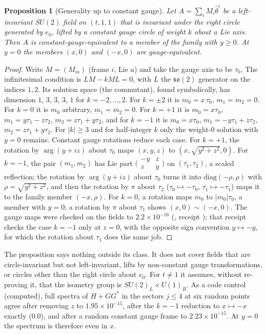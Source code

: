 \documentclass[11pt]{article}
\newtheorem{proposition}[theorem]{Proposition}
\theoremstyle{definition}
\theoremstyle{remark}
\begin{document}
\begin{proposition}[Generality up to constant gauge]\label{prop:general}
Let $A=\sum_iM_i\hat\theta^i$ be a left-invariant $SU(2)$ field on $(t,1,1)$ that is invariant under the right circle
generated by $e_0$, lifted by a constant gauge circle of weight $k$ about a Lie axis. Then $A$ is constant-gauge-equivalent
to a member of the family with $y\ge0$. At $y=0$ the members $(x,0)$ and $(-x,0)$ are gauge-equivalent.
\end{proposition}
\begin{proof}
Write $M=(M_{ia})$ (frame $i$, Lie $a$) and take the gauge axis to be $\tau_0$. The infinitesimal condition is
$LM-kML=0$, with $L$ the $\mathfrak{so}(2)$ generator on the indices $1,2$. Its solution space (the commutant), found
symbolically, has dimension $1$, $3$, $3$, $3$, $1$ for $k=-2,\dots,2$. For $k=\pm2$ it is $m_0=x\,\tau_0$,
$m_1=m_2=0$. For $k=0$ it is $m_0$ arbitrary, $m_1=m_2=0$. For $k=+1$ it is $m_0=x\tau_0$, $m_1=y\tau_1-z\tau_2$,
$m_2=z\tau_1+y\tau_2$, and for $k=-1$ it is $m_0=x\tau_0$, $m_1=-y\tau_1+z\tau_2$, $m_2=z\tau_1+y\tau_2$. For
$|k|\ge3$ and for half-integer $k$ only the weight-$0$ solution with $y=0$ remains. Constant gauge rotations reduce each
case. For $k=+1$, the rotation by $\arg(y+iz)$ about $\tau_0$ maps $(x,y,z)$ to $(x,\sqrt{y^2+z^2},0)$. For $k=-1$,
the pair $(m_1,m_2)$ has Lie part $\bigl(\begin{smallmatrix}-y&z\\ z&y\end{smallmatrix}\bigr)$ on $(\tau_1,\tau_2)$, a
scaled reflection; the rotation by $\arg(y+iz)$ about $\tau_0$ turns it into $\mathrm{diag}(-\rho,\rho)$ with
$\rho=\sqrt{y^2+z^2}$, and then the rotation by $\pi$ about $\tau_2$ ($\tau_0\mapsto-\tau_0$, $\tau_1\mapsto-\tau_1$)
maps it to the family member $(-x,\rho)$. For $k=0$, a rotation maps $m_0$ to $|m_0|\tau_0$, a member with $y=0$; a
rotation by $\pi$ about $\tau_1$ shows $(x,0)\sim(-x,0)$. The gauge maps were checked on the fields to
$2.2\times10^{-16}$ (, receipt
); that receipt checks the case $k=-1$ only at $z=0$, with
the opposite sign convention $y\mapsto-y$, for which the rotation about $\tau_1$ does the same job.
\end{proof}

The proposition says nothing outside its class. It does not cover fields that are circle-invariant but not
left-invariant, lifts by non-constant gauge transformations, or circles other than the right circle about $e_0$. For
$t\ne1$ it assumes, without re-proving it, that the isometry group is $SU(2)_L\times U(1)_R$. As a code control
(computed), full spectra of $H+GG^*$ in the sectors $j\le4$ at six random points agree after removing $z$ to
$1.95\times10^{-15}$, after the $k=-1$ reduction to $x\mapsto-x$ exactly ($0.0$), and after a random constant gauge
frame to $2.23\times10^{-15}$. At $y=0$ the spectrum is therefore even in $x$.
\end{document}
